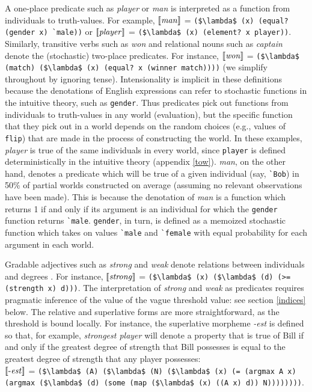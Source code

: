 \documentclass[pdfextras]{handbook}
\newcommand{\llbracket}{\ensuremath{\left [\!\left [}}%
\newcommand{\rrbracket}{\ensuremath{\right ]\!\right ]}}
\providecommand{\sv}[1]{\ensuremath{\llbracket \mathit{#1} \rrbracket}}
\begin{document}
A one-place predicate such as \emph{player} or \emph{man} is interpreted as a function from individuals to truth-values. 
For example, 
\sv{man} = \lstinline[mathescape]{($\lambda$ (x) (equal? (gender x) `male))} or \sv{player} = \lstinline[mathescape]{($\lambda$ (x) (element? x player))}.
Similarly, transitive verbs such as \emph{won} and relational nouns such as \emph{captain} denote the (stochastic) two-place predicates. For instance, \sv{won} = \lstinline[mathescape]{($\lambda$ (match) ($\lambda$ (x) (equal? x (winner match))))} (we simplify throughout by ignoring tense).
%
Intensionality is implicit in these definitions because the denotations of English expressions can refer to stochastic functions in the intuitive theory, such as \lstinline{gender}.
Thus predicates pick out functions from individuals to truth-values in any world (evaluation), but the specific function that they pick out in a world depends on the random choices (e.g., values of \lstinline{flip}) that are made in the process of constructing the world. 
In these examples, \emph{player} is true of the same individuals in every world, since \lstinline{player} is defined deterministically in the intuitive theory (appendix \ref{tow}). 
\emph{man}, on the other hand, denotes a predicate which will be true of a given individual (say, \lstinline{`Bob}) in 50\% of partial worlds constructed on average (assuming no relevant observations have been made). 
This is because the denotation of \emph{man} is a function which returns 1 if and only if its argument is an individual for which the \lstinline{gender} function returns \lstinline{`male}. 
\lstinline{gender}, in turn, is defined %
as a memoized stochastic function which takes on values \lstinline{`male} and \lstinline{`female} with equal probability for each argument in each world. 

Gradable adjectives such as \emph{strong} and \emph{weak} denote relations between individuals and degrees \citep[][etc.]{cresswell76,vonstechow84}. 
For instance, \sv{strong} = \lstinline[mathescape]{($\lambda$ (x) ($\lambda$ (d) (>= (strength x) d)))}.
The interpretation of \emph{strong} and \emph{weak} as predicates requires pragmatic inference of the value of the vague threshold value: see section \ref{indices} below.
The relative and superlative forms are more straightforward, as the threshold is bound locally. For instance, the superlative morpheme \emph{-est} is defined so that, for example, \emph{strongest player} will denote a property that is true of Bill if and only if the greatest degree of strength that Bill possesses is equal to the greatest degree of strength that any player possesses: \\
 \sv{\text{-}est} = \lstinline[mathescape]{($\lambda$ (A) ($\lambda$ (N) ($\lambda$ (x) (= (argmax A x) (argmax ($\lambda$ (d) (some (map ($\lambda$ (x) ((A x) d)) N))))))))}.
\end{document}
